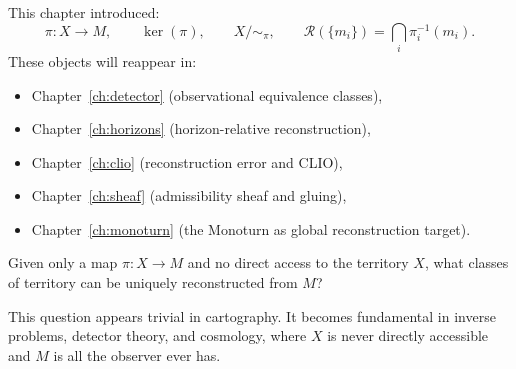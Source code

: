 \begin{MathEcho}
  This chapter introduced:
  \[
    \pi : X \to M,
    \qquad
    \ker(\pi),
    \qquad
    X / {\sim_\pi},
    \qquad
    \mathcal{R}(\{m_i\}) = \bigcap_i \pi_i^{-1}(m_i).
  \]
  These objects will reappear in:
  \begin{itemize}[leftmargin=1.5em,itemsep=0pt]
    \item Chapter~\ref{ch:detector}
      (observational equivalence classes),
    \item Chapter~\ref{ch:horizons}
      (horizon-relative reconstruction),
    \item Chapter~\ref{ch:clio}
      (reconstruction error and CLIO),
    \item Chapter~\ref{ch:sheaf}
      (admissibility sheaf and gluing),
    \item Chapter~\ref{ch:monoturn}
      (the Monoturn as global reconstruction target).
  \end{itemize}
\end{MathEcho}

\begin{OpenQuestion}
  Given only a map $\pi : X \to M$ and no direct access to
  the territory $X$, what classes of territory can be uniquely
  reconstructed from $M$?

  This question appears trivial in cartography.
  It becomes fundamental in inverse problems, detector theory,
  and cosmology, where $X$ is never directly accessible and
  $M$ is all the observer ever has.
\end{OpenQuestion}



